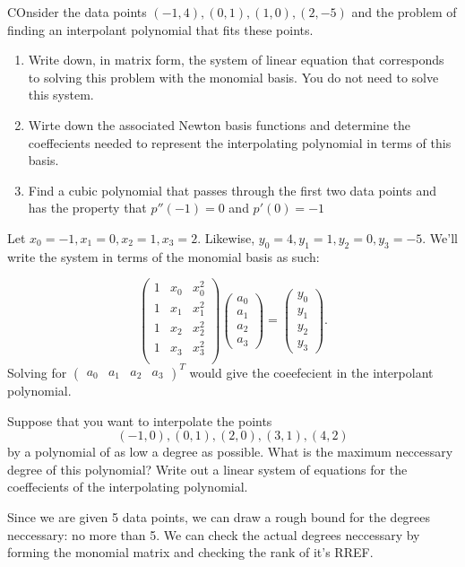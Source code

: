 \documentclass[5pt, a4paper]{article}
\begin{document}
\begin{tcolorbox}[title=Question 6]
    COnsider the data points $(-1,4),(0,1),(1,0),(2,-5)$ and the problem of
    finding an interpolant polynomial that fits these points.
     \begin{enumerate}
        \item Write down, in matrix form, the system of linear equation that
            corresponds to solving this problem with the monomial basis. You do
            not need to solve this system.
        \item Wirte down the associated Newton basis functions and determine the
            coeffecients needed to represent the interpolating polynomial in
            terms of this basis.
        \item Find a cubic polynomial that passes through the first two data
            points and has the property that $p''(-1) = 0$ and  $p'(0) = -1$
    \end{enumerate}
\end{tcolorbox}

Let $x_0 = -1, x_1 = 0, x_2 = 1, x_3 = 2$. Likewise, $y_0 = 4, y_1 = 1, y_2 = 0,
y_3 = -5$. We'll write the system in terms of the monomial basis as such:

\[
\begin{pmatrix} 
    1 & x_0 & x_0^2 \\ 
    1 & x_1 & x_1^2 \\ 
    1 & x_2 & x_2^2 \\
    1 & x_3 & x_3^2 \\
\end{pmatrix} 
 \begin{pmatrix} a_0 \\ a_1 \\ a_2 \\ a_3 \end{pmatrix} 
 = \begin{pmatrix} y_0 \\ y_1 \\ y_2 \\ y_3 \end{pmatrix} 
.\] 
Solving for $\begin{pmatrix} a_0 & a_1 & a_2 & a_3 \end{pmatrix}^T$ would
give the coeefecient in the interpolant polynomial.



\begin{tcolorbox}[title=Question 7]
    Suppose that you want to interpolate the points \[
        (-1,0),(0,1),(2,0),(3,1),(4,2)
    \] 
    by a polynomial of as low a degree as possible. What is the maximum
    neccessary degree of this polynomial? Write out a linear system of equations
    for the coeffecients of the interpolating polynomial.
\end{tcolorbox}

Since we are given 5 data points, we can draw a rough bound for the degrees
neccessary: no more than 5. We can check the actual degrees neccessary by
forming the monomial matrix and checking the rank of it's RREF.
\end{document}
